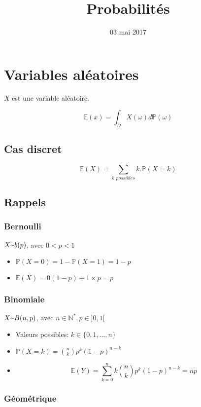 \documentclass{article}
\title{Probabilités}
\date{03 mai 2017}
\newcommand{\textapprox}{\raisebox{0.5ex}{\texttildelow}}
\begin{document}
\maketitle

\section{Variables aléatoires}
$X$ est une variable aléatoire.

$$\mathbb{E}(x) = \int_{\Omega} X(\omega) d\mathbb{P}(\omega)$$

\subsection{Cas discret}
\[
  \mathbb{E}(X)=\sum_{\textit{k possibles}} k.\mathbb{P}(X=k)
\]

\subsection{Rappels}
\subsubsection{Bernoulli}

$X \textapprox b(p)$, avec $0<p<1$
  \begin{itemize}
    \item $\mathbb{P}(X=0) = 1-\mathbb{P}(X=1)=1-p$
    \item $\mathbb{E}(X)=0(1-p)+1 \times p = p$
  \end{itemize}

\subsubsection{Binomiale}

$X \textapprox B(n,p)$, avec $n \in \mathbb{N}^{*}, p \in ] 0,1 [$
  \begin{itemize}
    \item Valeurs possibles: $k \in \{0,1,...,n\}$
    \item $\mathbb{P}(X=k) = \binom{n}{k} p^k (1-p)^{n-k}$
    \item $$\mathbb{E}(Y) = \sum_{k=0}^n k \binom{n}{k} p^k(1-p)^{n-k} = np$$
  \end{itemize}

\subsubsection{Géométrique}
\end{document}
